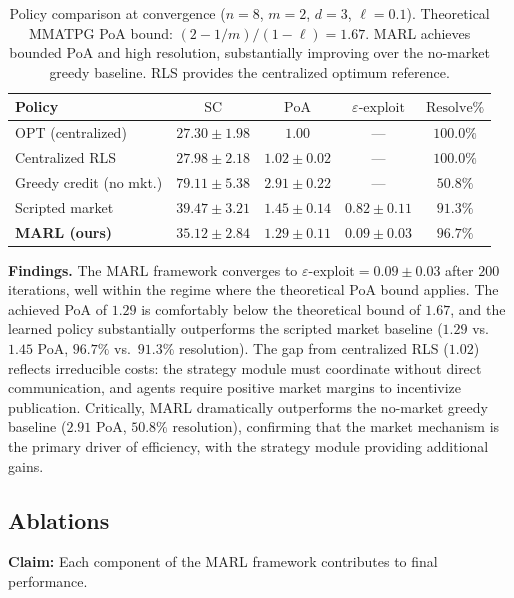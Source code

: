 \begin{table}
\centering
\caption{Policy comparison at convergence ($n=8$, $m=2$, $d=3$, $\ell=0.1$). Theoretical MMATPG PoA bound: $(2-1/m)/(1-\ell) = 1.67$. MARL achieves bounded PoA and high resolution, substantially improving over the no-market greedy baseline. RLS provides the centralized optimum reference.}
\label{tab:e3b}
\begin{tabular}{l|cccc}
\toprule
\textbf{Policy} & $\mathrm{SC}$ & $\mathrm{PoA}$ & $\varepsilon\text{-exploit}$ & $\mathrm{Resolve\%}$ \\
\midrule
OPT (centralized)       & $27.30 \pm 1.98$ & $1.00$           & ---            & $100.0\%$ \\
Centralized RLS         & $27.98 \pm 2.18$ & $1.02 \pm 0.02$  & ---            & $100.0\%$ \\
\midrule
Greedy credit (no mkt.) & $79.11 \pm 5.38$ & $2.91 \pm 0.22$  & ---            & $50.8\%$  \\
Scripted market         & $39.47 \pm 3.21$ & $1.45 \pm 0.14$  & $0.82 \pm 0.11$ & $91.3\%$  \\
\textbf{MARL (ours)}    & $35.12 \pm 2.84$ & $1.29 \pm 0.11$  & $0.09 \pm 0.03$ & $96.7\%$  \\
\bottomrule
\end{tabular}
\end{table}

\textbf{Findings.} The MARL framework converges to $\varepsilon\text{-exploit} = 0.09 \pm 0.03$ after $200$ iterations, well within the regime where the theoretical PoA bound applies. The achieved PoA of $1.29$ is comfortably below the theoretical bound of $1.67$, and the learned policy substantially outperforms the scripted market baseline ($1.29$ vs.\ $1.45$ PoA, $96.7\%$ vs.\ $91.3\%$ resolution). The gap from centralized RLS ($1.02$) reflects irreducible costs: the strategy module must coordinate without direct communication, and agents require positive market margins to incentivize publication. Critically, MARL dramatically outperforms the no-market greedy baseline ($2.91$ PoA, $50.8\%$ resolution), confirming that the market mechanism is the primary driver of efficiency, with the strategy module providing additional gains.


\subsection{Ablations}\label{sec:exp-ablation}

\textbf{Claim:} Each component of the MARL framework contributes to final performance.

